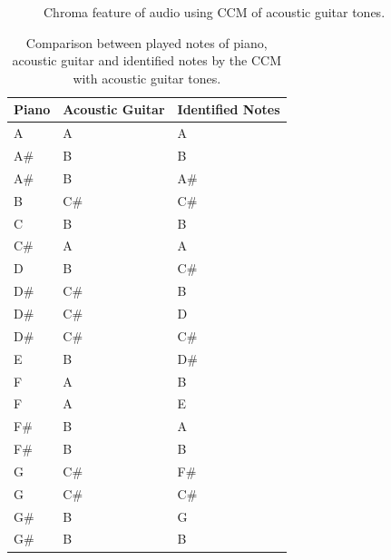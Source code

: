 \documentclass{article}
\begin{document}
	\begin{figure}[h!]
	 \centerline{}
	 \caption{Chroma feature of audio using CCM of acoustic guitar tones.}
	 \label{fig:2-ccm-violao}
	\end{figure}	


	\begin{table}[h!]
	 \begin{center}
	 \begin{tabular}{|l|l|l|}
	  \hline
	  Piano & Acoustic Guitar & Identified Notes \\
	  \hline
			  A & A &  A \\
		A\# &  B &  B \\
		    A\# &  B &    A\# \\
		    B  &   C\# &  C\# \\
		    C   &  B  &   B \\
		    C\# &  A   &  A \\
		    D   &  B   &  C\# \\
		    D\# &  C\# &  B \\
		    D\# &  C\# &  D \\
		    D\# &  C\# &  C\# \\
		    E   &  B  &   D\# \\
		    F   &  A   &  B \\
		    F   &  A  &   E \\
		    F\# &  B  &   A \\
		    F\# &  B   &  B \\
		    G   &  C\# &  F\# \\
		    G   &  C\# &  C\# \\
		    G\# &  B   &  G \\
		    G\# &  B  &   B \\
	  \hline
	 \end{tabular}
	\end{center}
	 \caption{Comparison between played notes of piano, acoustic guitar and identified notes by the CCM with acoustic guitar tones.}
	 \label{tab:table-2-ccm-violao}
	\end{table}
\end{document}

